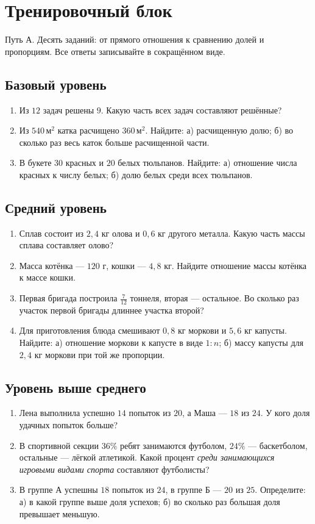 \documentclass[a4paper,12pt]{article}
\begin{document}
\clearpage

\section*{Тренировочный блок}
\textcolor{muted}{\small Путь А. Десять заданий: от прямого отношения к сравнению долей и пропорциям. Все ответы записывайте в сокращённом виде.}

\subsection*{Базовый уровень}
\begin{enumerate}[label=\textbf{\arabic*.},itemsep=8pt]
\item Из $12$ задач решены $9$. Какую часть всех задач составляют решённые?
\item Из $540\,\text{м}^2$ катка расчищено $360\,\text{м}^2$. Найдите: а) расчищенную долю; б) во сколько раз весь каток больше расчищенной части.
\item В букете $30$ красных и $20$ белых тюльпанов. Найдите: а) отношение числа красных к числу белых; б) долю белых среди всех тюльпанов.
\end{enumerate}
\subsection*{Средний уровень}
\begin{enumerate}[label=\textbf{\arabic*.},start=4,itemsep=8pt]
\item Сплав состоит из $2{,}4$ кг олова и $0{,}6$ кг другого металла. Какую часть массы сплава составляет олово?
\item Масса котёнка --- $120$ г, кошки --- $4{,}8$ кг. Найдите отношение массы котёнка к массе кошки.
\item Первая бригада построила $\frac7{12}$ тоннеля, вторая --- остальное. Во сколько раз участок первой бригады длиннее участка второй?
\item Для приготовления блюда смешивают $0{,}8$ кг моркови и $5{,}6$ кг капусты. Найдите: а) отношение моркови к капусте в виде $1:n$; б) массу капусты для $2{,}4$ кг моркови при той же пропорции.
\end{enumerate}
\subsection*{Уровень выше среднего}
\begin{enumerate}[label=\textbf{\arabic*.},start=8,itemsep=8pt]
\item Лена выполнила успешно $14$ попыток из $20$, а Маша --- $18$ из $24$. У кого доля удачных попыток больше?
\item В спортивной секции $36\%$ ребят занимаются футболом, $24\%$ --- баскетболом, остальные --- лёгкой атлетикой. Какой процент \emph{среди занимающихся игровыми видами спорта} составляют футболисты?
\item В группе А успешны $18$ попыток из $24$, в группе Б --- $20$ из $25$. Определите: а) в какой группе выше доля успехов; б) во сколько раз большая доля превышает меньшую.
\end{enumerate}
\end{document}
